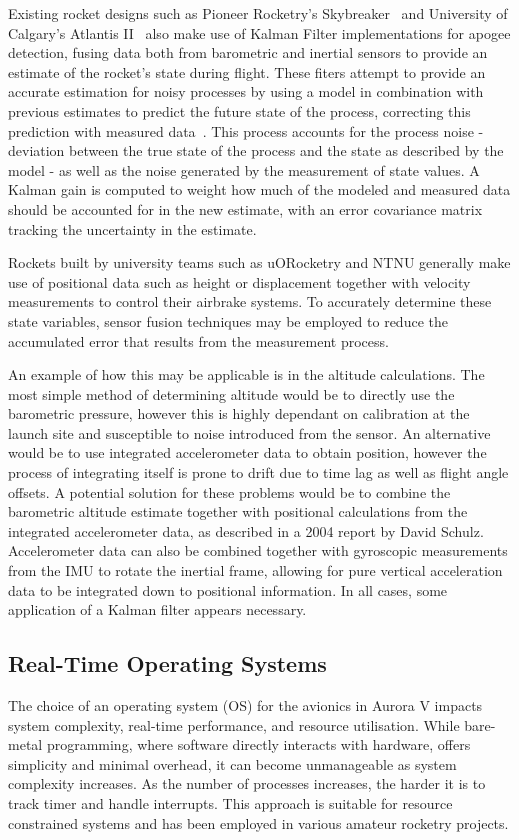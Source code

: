 Existing rocket designs such as Pioneer Rocketry's Skybreaker~\cite{Pioneer2016} and University of Calgary's Atlantis II~\cite{Atlantis2018} also make use of Kalman Filter implementations for apogee detection, fusing data both from barometric and inertial sensors to provide an estimate of the rocket's state during flight. These fiters attempt to provide an accurate estimation for noisy processes by using a model in combination with previous estimates to predict the future state of the process, correcting this prediction with measured data~\cite{Welch1995,kalman1960}. This process accounts for the process noise - deviation between the true state of the process and the state as described by the model - as well as the noise generated by the measurement of state values. A Kalman gain is computed to weight how much of the modeled and measured data should be accounted for in the new estimate, with an error covariance matrix tracking the uncertainty in the estimate.

Rockets built by university teams such as uORocketry and NTNU generally make use of positional data such as height or displacement together with velocity measurements to control their airbrake systems\cite{uORocketry, NTNU}. To accurately determine these state variables, sensor fusion techniques may be employed to reduce the accumulated error that results from the measurement process. 

An example of how this may be applicable is in the altitude calculations. The most simple method of determining altitude would be to directly use the barometric pressure, however this is highly dependant on calibration at the launch site and susceptible to noise introduced from the sensor. An alternative would be to use integrated accelerometer data to obtain position, however the process of integrating itself is prone to drift due to time lag as well as flight angle offsets. A potential solution for these problems would be to combine the barometric altitude estimate together with positional calculations from the integrated accelerometer data, as described in a 2004 report by David Schulz\cite{kalman-apogee}. Accelerometer data can also be combined together with gyroscopic measurements from the IMU to rotate the inertial frame, allowing for pure vertical acceleration data to be integrated down to positional information. In all cases, some application of a Kalman filter appears necessary.

\subsection{Real-Time Operating Systems}
The choice of an operating system (OS) for the avionics in Aurora V impacts system complexity, real-time performance, and resource utilisation. While bare-metal programming, where software directly interacts with hardware, offers simplicity and minimal overhead, it can become unmanageable as system complexity increases. As the number of processes increases, the harder it is to track timer and handle interrupts. This approach is suitable for resource constrained systems and has been employed in various amateur rocketry projects. 

